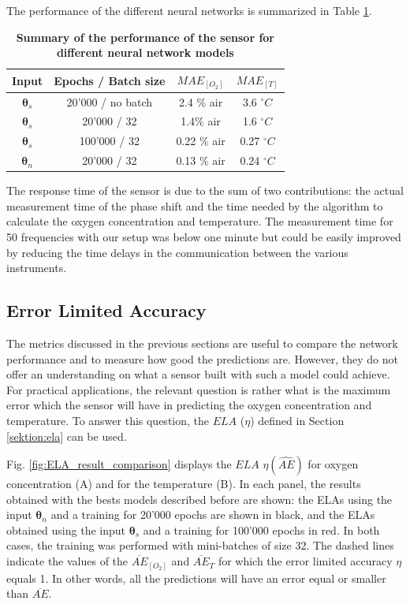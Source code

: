 \documentclass[sensors,article,submit,moreauthors,pdftex,10pt,a4paper]{Definitions/mdpi}
\begin{document}
The performance of the different neural networks is summarized in Table \ref{TableMAE_summary}. 
\begin{table}[hbt]
\centering
\caption {\bf Summary of the performance of the sensor for different neural network models}

\begin{tabular}{ cccc}
\smallskip 
 Input & Epochs / Batch size & $MAE_{[O_2]}$ & $MAE_{[T]}$  \\ 
 \hline
${\pmb \theta}_s$ & 20'000 / \textrm{no batch} & 2.4 \% air & 3.6 $^\circ C$\\ 
${\pmb \theta}_s$ & 20'000 / 32 & 1.4\% air & 1.6 $^\circ C$\\ 
${\pmb \theta}_s$& 100'000 / 32 & 0.22 \% air & 0.27 $^\circ C$\\ 
${\pmb \theta}_n$ & 20'000 / 32 & 0.13 \% air & 0.24 $^\circ C$\\ 
\end{tabular}
\label{TableMAE_summary}
\end{table}

The response time of the sensor is due to the sum of two contributions: the actual measurement time of the phase shift and the time needed by the algorithm to calculate the oxygen concentration and temperature. The measurement time for 50 frequencies with our setup was below one minute but could be easily improved by reducing the time delays in the communication between the various instruments.

\subsection{Error Limited Accuracy}

The metrics discussed in the previous sections are useful to compare the network performance and to measure how good the predictions are. However, they do not offer an understanding on what a sensor built with such a model could achieve. For practical applications, the relevant question is rather what is the maximum error which the sensor will have in predicting the oxygen concentration and temperature. To answer this question, the $ELA$ ($\eta$) defined in Section \ref{sektion:ela} can be used. 

Fig. \ref{fig:ELA_result_comparison} displays the $ELA$ $\eta(\widehat {AE})$ for oxygen concentration (A) and for the temperature (B). In each panel, the results obtained with the bests models described before are shown: the ELAs using the input ${\pmb \theta}_n$ and a training for 20'000 epochs are shown in black, and the ELAs obtained using the input ${\pmb \theta}_s$ and a training for 100'000 epochs in red. In both cases, the training was performed with mini-batches of size 32.
The dashed lines indicate the values of the $\overline{AE}_{[O_2]}$ and $\overline{AE}_{T}$ for which the error limited accuracy $\eta$ equals 1. In other words, all the predictions will have an error equal or smaller than $\overline{AE}$.
\end{document}
